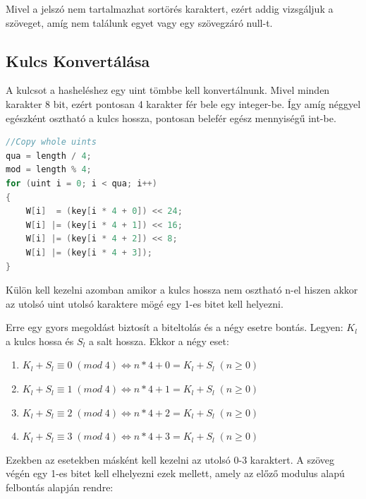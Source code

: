 Mivel a jelszó nem tartalmazhat sortörés karaktert, ezért addig vizsgáljuk a szöveget, amíg nem találunk egyet vagy egy szövegzáró null-t.



\subsection{Kulcs Konvertálása}


A kulcsot a hasheléshez egy uint tömbbe kell konvertálnunk. Mivel minden karakter 8 bit, ezért pontosan 4 karakter fér bele egy integer-be. Így amíg néggyel egészként osztható a kulcs hossza, pontosan belefér egész mennyiségű int-be.

\begin{lstlisting}[language={C++}]
//Copy whole uints
qua = length / 4;
mod = length % 4;
for (uint i = 0; i < qua; i++)
{
    W[i]  = (key[i * 4 + 0]) << 24;
    W[i] |= (key[i * 4 + 1]) << 16;
    W[i] |= (key[i * 4 + 2]) << 8;
    W[i] |= (key[i * 4 + 3]);
}
\end{lstlisting}

Külön kell kezelni azomban amikor a kulcs hossza nem osztható n-el hiszen akkor az utolsó uint utolsó karaktere mögé egy 1-es bitet kell helyezni.

Erre egy gyors megoldást biztosít a biteltolás és a négy esetre bontás. Legyen: $K_l$ a kulcs hossa és $S_l$ a salt hossza. Ekkor a négy eset:

\begin{enumerate}
    \item $K_l + S_l \equiv 0 \; (mod \; 4) \iff n * 4 + 0 = K_l + S_l \; (n \geq 0)$
    \item $K_l + S_l \equiv 1 \; (mod \; 4) \iff n * 4 + 1 = K_l + S_l \; (n \geq 0)$
    \item $K_l + S_l \equiv 2 \; (mod \; 4) \iff n * 4 + 2 = K_l + S_l \; (n \geq 0)$
    \item $K_l + S_l \equiv 3 \; (mod \; 4) \iff n * 4 + 3 = K_l + S_l \; (n \geq 0)$
\end{enumerate}

Ezekben az esetekben másként kell kezelni az utolsó 0-3 karaktert. A szöveg végén egy 1-es bitet kell elhelyezni ezek mellett, amely az előző modulus alapú felbontás alapján rendre:

